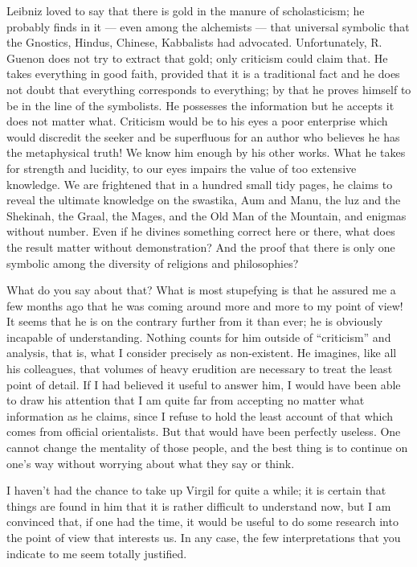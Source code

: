 \begin{quotex}
Leibniz loved to say that there is gold in the manure of scholasticism; he probably finds in it --- even among the alchemists --- that universal symbolic that the Gnostics, Hindus, Chinese, Kabbalists had advocated. Unfortunately, R. Guenon does not try to extract that gold; only criticism could claim that. He takes everything in good faith, provided that it is a traditional fact and he does not doubt that everything corresponds to everything; by that he proves himself to be in the line of the symbolists. He possesses the information but he accepts it does not matter what. Criticism would be to his eyes a poor enterprise which would discredit the seeker and be superfluous for an author who believes he has the metaphysical truth! We know him enough by his other works. What he takes for strength and lucidity, to our eyes impairs the value of too extensive knowledge. We are frightened that in a hundred small tidy pages, he claims to reveal the ultimate knowledge on the swastika, Aum and Manu, the luz and the Shekinah, the Graal, the Mages, and the Old Man of the Mountain, and enigmas without number. Even if he divines something correct here or there, what does the result matter without demonstration? And the proof that there is only one symbolic among the diversity of religions and philosophies?
\end{quotex}


What do you say about that? What is most stupefying is that he assured me a few months ago that he was coming around more and more to my point of view! It seems that he is on the contrary further from it than ever; he is obviously incapable of understanding. Nothing counts for him outside of ``criticism'' and analysis, that is, what I consider precisely as non-existent. He imagines, like all his colleagues, that volumes of heavy erudition are necessary to treat the least point of detail. If I had believed it useful to answer him, I would have been able to draw his attention that I am quite far from accepting no matter what information as he claims, since I refuse to hold the least account of that which comes from official orientalists. But that would have been perfectly useless. One cannot change the mentality of those people, and the best thing is to continue on one's way without worrying about what they say or think.

I haven't had the chance to take up Virgil for quite a while; it is certain that things are found in him that it is rather difficult to understand now, but I am convinced that, if one had the time, it would be useful to do some research into the point of view that interests us. In any case, the few interpretations that you indicate to me seem totally justified.

